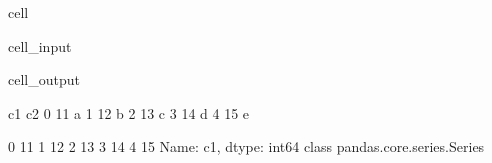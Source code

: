 \documentclass[letterpaper,10pt,english]{jupyterBook}
\begin{document}
\begin{sphinxuseclass}{cell}\begin{sphinxVerbatimInput}

\begin{sphinxuseclass}{cell_input}
\begin{sphinxVerbatim}[commandchars=\\\{\}]
  \PYG{p}{[}\PYG{p}{]}
  \PYG{p}{[}\PYG{p}{]}

     
   


\PYG{p}{[}\PYG{p}{]} \PYG{p}{[}\PYG{p}{]}
\end{sphinxVerbatim}

\end{sphinxuseclass}\end{sphinxVerbatimInput}
\begin{sphinxVerbatimOutput}

\begin{sphinxuseclass}{cell_output}
\begin{sphinxVerbatim}[commandchars=\\\{\}]
   c1 c2
0  11  a
1  12  b
2  13  c
3  14  d
4  15  e


0    11
1    12
2    13
3    14
4    15
Name: c1, dtype: int64 \PYGZlt{}class \PYGZsq{}pandas.core.series.Series\PYGZsq{}\PYGZgt{}
\end{sphinxVerbatim}

\end{sphinxuseclass}\end{sphinxVerbatimOutput}

\end{sphinxuseclass}






\renewcommand{\indexname}{Index}
\printindex
\end{document}
